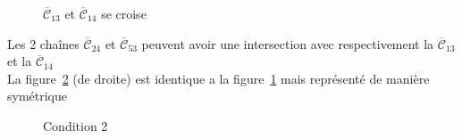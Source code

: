 \documentclass[french]{report}
\begin{document}
\begin{figure}[!ht]\centering
	\begin{changemargin}{-3cm}{-3cm}
		\begin{center}
			
			\caption{$\overline{\mathcal{C}}_{13}$ et $\overline{\mathcal{C}}_{14}$ se croise}\label{fig:cas4_cond2_2}
		\end{center}
	\end{changemargin}
\end{figure}
\FloatBarrier
Les 2 chaînes $\overline{\mathcal{C}}_{24}$ et $\overline{\mathcal{C}}_{53}$ peuvent avoir une intersection avec respectivement la  $\overline{\mathcal{C}}_{13}$  et la  $\overline{\mathcal{C}}_{14}$\\
La figure~\ref{fig:cas4_cond2} (de droite) est identique a la figure~\ref{fig:cas4_cond2_2} mais représenté de manière symétrique\\

\begin{figure}[!h]\centering
	\begin{changemargin}{-3cm}{-3cm}
		\begin{center}
			
			\hspace{15pt}
			
			\hspace{15pt}
			
		\end{center}
	\end{changemargin}
	\begin{changemargin}{1.75cm}{1.75cm}
		\caption{Condition 2}\label{fig:cas4_cond2}
	\end{changemargin}
\end{figure}
\FloatBarrier
\end{document}
